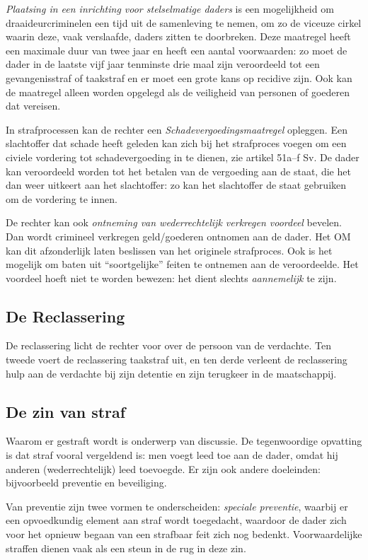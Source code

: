 \documentclass{article}
\begin{document}
\emph{Plaatsing in een inrichting voor stelselmatige daders} is een
mogelijkheid om draaideurcriminelen een tijd uit de samenleving te nemen, om zo
de viceuze cirkel waarin deze, vaak verslaafde, daders zitten te doorbreken.
Deze maatregel heeft een maximale duur van twee jaar en heeft een aantal
voorwaarden: zo moet de dader in de laatste vijf jaar tenminste drie maal zijn
veroordeeld tot een gevangenisstraf of taakstraf en er moet een grote kans op
recidive zijn. Ook kan de maatregel alleen worden opgelegd als de veiligheid
van personen of goederen dat vereisen.

In strafprocessen kan de rechter een \emph{Schadevergoedingsmaatregel} opleggen.
Een slachtoffer dat schade heeft geleden kan zich bij het strafproces voegen om
een civiele vordering tot schadevergoeding in te dienen, zie artikel 51a--f Sv.
De dader kan veroordeeld worden tot het betalen van de vergoeding aan de staat,
die het dan weer uitkeert aan het slachtoffer: zo kan het slachtoffer de staat
gebruiken om de vordering te innen.

De rechter kan ook \emph{ontneming van wederrechtelijk verkregen voordeel}
bevelen. Dan wordt crimineel verkregen geld/goederen ontnomen aan de dader. Het
OM kan dit afzonderlijk laten beslissen van het originele strafproces. Ook is
het mogelijk om baten uit ``soortgelijke'' feiten te ontnemen aan de
veroordeelde. Het voordeel hoeft niet te worden bewezen: het dient slechts
\emph{aannemelijk} te zijn.

\subsection{De Reclassering}

De reclassering licht de rechter voor over de persoon van de verdachte. Ten
tweede voert de reclassering taakstraf uit, en ten derde verleent de
reclassering hulp aan de verdachte bij zijn detentie en zijn terugkeer in de
maatschappij.

\subsection{De zin van straf}

Waarom er gestraft wordt is onderwerp van discussie. De tegenwoordige opvatting
is dat straf vooral vergeldend is: men voegt leed toe aan de dader, omdat hij
anderen (wederrechtelijk) leed toevoegde. Er zijn ook andere doeleinden:
bijvoorbeeld preventie en beveiliging.

Van preventie zijn twee vormen te onderscheiden: \emph{speciale preventie},
waarbij er een opvoedkundig element aan straf wordt toegedacht, waardoor de
dader zich voor het opnieuw begaan van een strafbaar feit zich nog bedenkt.
Voorwaardelijke straffen dienen vaak als een steun in de rug in deze zin.
\end{document}
